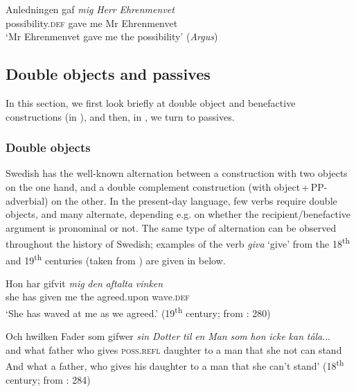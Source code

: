 \documentclass[output=paper]{langscibook}
\begin{document}
\ex
\gll  Anledningen     gaf \textit{mig} \textit{Herr} \textit{Ehrenmenvet}  \\
       possibility.\textsc{def}  gave   me   Mr  Ehrenmenvet\\
    \glt `Mr Ehrenmenvet gave me the possibility’ (\textit{Argus})
\z
\z

\subsection{Double objects and passives}\label{sec:intro:3.3}


In this section, we first look briefly at double object and benefactive constructions (in ), and then, in , we turn to passives.


\subsubsection{Double objects}\label{sec:intro:3.3.1}


Swedish has the well-known alternation between a construction with two objects on the one hand, and a double complement construction (with object\,+\,PP-adverbial) on the other. In the present-day language, few verbs require double objects, and many alternate, depending e.g. on whether the recipient/benefactive argument is pronominal or not. The same type of alternation can be observed throughout the history of Swedish; examples of the verb \textit{giva} ‘give’ from the 18\textsuperscript{th} and 19\textsuperscript{th} centuries (taken from \citealt{Valdeson2016}) are given in  below.


\ea \label{ex:intro:22}
\ea \label{ex:intro:22a}
\gll  Hon har gifvit \textit{mig} \textit{den} \textit{aftalta} \textit{vinken} \\      
     she   has given   me   the   agreed.upon  wave.\textsc{def}\\
     \glt ‘She has waved at me as we agreed.’ (19\textsuperscript{th} century; from \citealt{Valdeson2016}: 280) 

\ex\label{ex:intro:22b}
\gll  Och hwilken Fader som gifwer \textit{sin} \textit{Dotter} \textit{til} \textit{en} \textit{Man} \textit{som} \textit{hon} \textit{icke} \textit{kan} \textit{tåla}... \\
      and   what    father   who gives     \textsc{poss.refl}  daughter     to   a   man that she   not   can  stand\\
\glt  And what a father, who gives his daughter to a man that she can’t stand’ (18\textsuperscript{th} century; from \citealt{Valdeson2016}: 284)
\end{document}
